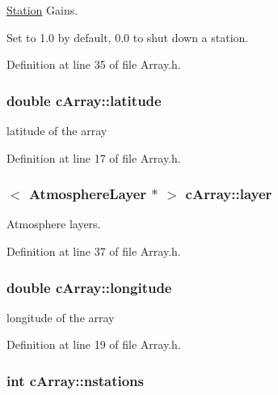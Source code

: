 \hyperlink{classStation}{Station} Gains. 

Set to 1.0 by default, 0.0 to shut down a station. 

Definition at line 35 of file Array.h.

\hypertarget{classcArray_a9508d1287d4349f6e5aa37a903512237}{
\subsubsection[{latitude}]{\setlength{\rightskip}{0pt plus 5cm}double {\bf cArray::latitude}}}
\label{classcArray_a9508d1287d4349f6e5aa37a903512237}


latitude of the array 



Definition at line 17 of file Array.h.

\hypertarget{classcArray_a78170c7d575b10616a74a84c6a6ebe70}{
\subsubsection[{layer}]{$<$ {\bf AtmosphereLayer} $\ast$ $>$ {\bf cArray::layer}}}
\label{classcArray_a78170c7d575b10616a74a84c6a6ebe70}


Atmosphere layers. 



Definition at line 37 of file Array.h.

\hypertarget{classcArray_a216223dbb53b67e9035279018ce1d599}{
\subsubsection[{longitude}]{\setlength{\rightskip}{0pt plus 5cm}double {\bf cArray::longitude}}}
\label{classcArray_a216223dbb53b67e9035279018ce1d599}


longitude of the array 



Definition at line 19 of file Array.h.

\hypertarget{classcArray_ab9cbddaf61761740b3e29d2e4a9f51be}{
\subsubsection[{nstations}]{\setlength{\rightskip}{0pt plus 5cm}int {\bf cArray::nstations}}}
\label{classcArray_ab9cbddaf61761740b3e29d2e4a9f51be}


